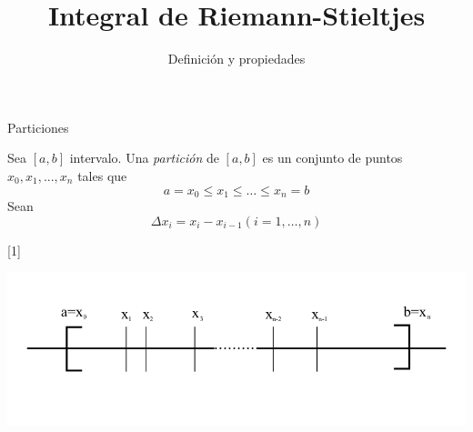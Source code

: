 \documentclass[11pt]{beamer}
\author{Definición y propiedades}
\title{Integral de Riemann-Stieltjes}
\begin{document}
\begin{frame}
\titlepage
\end{frame}


\begin{frame}{Particiones}

\begin{definition}
Sea $[a, b]$ intervalo. Una \textit{partición} de $[a, b]$ es un conjunto de puntos $x_0, x_1,..., x_n$ tales que
\begin{equation*}
	a = x_0 \leq x_1 \leq \dots \leq x_n = b
\end{equation*}
Sean
\begin{equation*}
	\Delta x_i = x_i - x_{i-1} (i = 1, \dots, n)
\end{equation*}
\end{definition}[1]

\begin{center}
\includegraphics[scale=1]{img/particion.png}
\end{center}

\end{frame}
\end{document}
